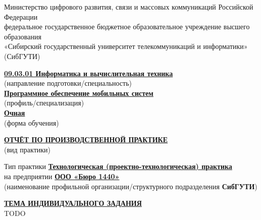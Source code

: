 \parindent=1.25cm
\pagestyle{empty}

\begin{center}
\small
Министерство цифрового развития, связи и массовых коммуникаций Российской Федерации\\
федеральное государственное бюджетное образовательное учреждение высшего образования\\
«Сибирский государственный университет телекоммуникаций и информатики»\\
(СибГУТИ)
\end{center}

\vspace{1em}

\begin{flushright}
\underline{\textbf{09.03.01 Информатика и вычислительная техника}}\\
(направление подготовки/специальность)\\[0.3em]
\underline{\textbf{Программное обеспечение мобильных систем}}\\
(профиль/специализация)\\[0.3em]
\underline{\textbf{Очная}}\\
(форма обучения)
\end{flushright}

\vspace{2em}

\begin{center}
\underline{\textbf{ОТЧЁТ ПО ПРОИЗВОДСТВЕННОЙ ПРАКТИКЕ}}\\
(вид практики)
\end{center}

\vspace{1em}

\begin{center}
Тип практики \underline{\textbf{Технологическая (проектно-технологическая) практика}}\\
на предприятии \underline{\textbf{ООО «Бюро 1440»}}\\
(наименование профильной организации/структурного подразделения \textbf{СибГУТИ})
\end{center}

\vspace{1.5em}

\begin{center}
\underline{\textbf{ТЕМА ИНДИВИДУАЛЬНОГО ЗАДАНИЯ}}\\[0.5em]
TODO
\end{center}

